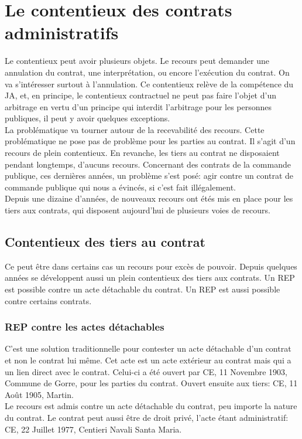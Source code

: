 \documentclass[10pt, a4paper, openany]{book}
\begin{document}
\chapter{Le contentieux des contrats administratifs}

Le contentieux peut avoir plusieurs objets. Le recours peut demander une annulation du contrat, une interprétation, ou encore l'exécution du contrat. On va s'intéresser surtout à l'annulation. Ce contentieux relève de la compétence du JA, et, en principe, le contentieux contractuel ne peut pas faire l'objet d'un arbitrage en vertu d'un principe qui interdit l'arbitrage pour les personnes publiques, il peut y avoir quelques exceptions. \\
La problématique va tourner autour de la recevabilité des recours. Cette problématique ne pose pas de problème pour les parties au contrat. Il s'agit d'un recours de plein contentieux. En revanche, les tiers au contrat ne disposaient pendant longtemps, d'aucuns recours. Concernant des contrats de la commande publique, ces dernières années, un problème s'est posé: agir contre un contrat de commande publique qui nous a évincés, si c'est fait illégalement. \\
Depuis une dizaine d'années, de nouveaux recours ont étés mis en place pour les tiers aux contrats, qui disposent aujourd'hui de plusieurs voies de recours.

\section{Contentieux des tiers au contrat}

Ce peut être dans certains cas un recours pour excès de pouvoir. Depuis quelques années se développent aussi un plein contentieux des tiers aux contrats. Un REP est possible contre un acte détachable du contrat. Un REP est aussi possible contre certains contrats.

\subsection{REP contre les actes détachables}

C'est une solution traditionnelle pour contester un acte détachable d'un contrat et non le contrat lui même. Cet acte est un acte extérieur au contrat mais qui a un lien direct avec le contrat. Celui-ci a été ouvert par CE, 11 Novembre 1903, Commune de Gorre, pour les parties du contrat. Ouvert ensuite aux tiers: CE, 11 Août 1905, Martin. \\
Le recours est admis contre un acte détachable du contrat, peu importe la nature du contrat. Le contrat peut aussi être de droit privé, l'acte étant administratif: CE, 22 Juillet 1977, Centieri Navali Santa Maria. 
\end{document}
